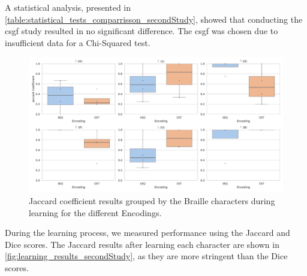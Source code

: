 A statistical analysis, presented in \autoref{table:statistical_tests_comparrisson_secondStudy}, showed that conducting the \gls{csgf} study resulted in no significant difference.
The \gls{csgf} was chosen due to insufficient data for a Chi-Squared test.

\begin{table}
    \caption{Statistical \gls{csgf} Results for the direct comparison between the stimuli.}
    \label{table:statistical_tests_comparrisson_secondStudy}
\end{table}




\begin{figure}
    \centering
    \includegraphics[width=\linewidth]{src/pictures/Study2Data_Experiment/study2_learning_results.pdf}
    \caption{Jaccard coefficient results grouped by the Braille characters during learning for the different Encodings.}
    \label{fig:learning_results_secondStudy}
\end{figure}

During the learning process, we measured performance using the Jaccard and Dice scores. The Jaccard results after learning each character are shown in \autoref{fig:learning_results_secondStudy}, as they are more stringent than the Dice scores.

